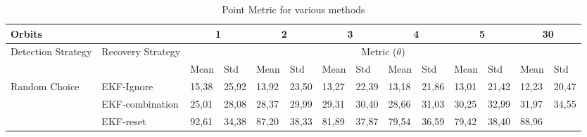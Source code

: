 \begin{table*}[]
	\label{Table: Point Metric for various methods}
	\caption{Point Metric for various methods}
	\centering
	\begin{tabular}{@{}llllllllllllll@{}}
		\toprule
		\multicolumn{2}{l}{Orbits} &
		\multicolumn{2}{c}{1} &
		\multicolumn{2}{c}{2} &
		\multicolumn{2}{c}{3} &
		\multicolumn{2}{c}{4} &
		\multicolumn{2}{c}{5} &
		\multicolumn{2}{c}{30} \\ \midrule
		\multicolumn{1}{|l|}{\multirow{2}{*}{Detection Strategy}} &
		\multicolumn{1}{l|}{\multirow{2}{*}{Recovery Strategy}} &
		\multicolumn{12}{c|}{Metric ($\theta$)} \\ \cmidrule(l){3-14} 
		\multicolumn{1}{|l|}{} &
		\multicolumn{1}{l|}{} &
		\multicolumn{1}{l|}{Mean} &
		\multicolumn{1}{l|}{Std} &
		\multicolumn{1}{l|}{Mean} &
		\multicolumn{1}{l|}{Std} &
		\multicolumn{1}{l|}{Mean} &
		\multicolumn{1}{l|}{Std} &
		\multicolumn{1}{l|}{Mean} &
		\multicolumn{1}{l|}{Std} &
		\multicolumn{1}{l|}{Mean} &
		\multicolumn{1}{l|}{Std} &
		\multicolumn{1}{l|}{Mean} &
		\multicolumn{1}{l|}{Std} \\ \midrule
		\multicolumn{1}{|l|}{\multirow{4}{*}{Random Choice}} &
		\multicolumn{1}{l|}{EKF-Ignore} &
		\multicolumn{1}{l|}{15,38} &
		\multicolumn{1}{l|}{25,92} &
		\multicolumn{1}{l|}{13,92} &
		\multicolumn{1}{l|}{23,50} &
		\multicolumn{1}{l|}{13,27} &
		\multicolumn{1}{l|}{22,39} &
		\multicolumn{1}{l|}{13,18} &
		\multicolumn{1}{l|}{21,86} &
		\multicolumn{1}{l|}{13,01} &
		\multicolumn{1}{l|}{21,42} &
		\multicolumn{1}{l|}{12,23} &
		\multicolumn{1}{l|}{20,47} \\ \cmidrule(l){2-14} 
		\multicolumn{1}{|l|}{} &
		\multicolumn{1}{l|}{EKF-combination} &
		\multicolumn{1}{l|}{25,01} &
		\multicolumn{1}{l|}{28,08} &
		\multicolumn{1}{l|}{28,37} &
		\multicolumn{1}{l|}{29,99} &
		\multicolumn{1}{l|}{29,31} &
		\multicolumn{1}{l|}{30,40} &
		\multicolumn{1}{l|}{28,66} &
		\multicolumn{1}{l|}{31,03} &
		\multicolumn{1}{l|}{30,25} &
		\multicolumn{1}{l|}{32,99} &
		\multicolumn{1}{l|}{31,97} &
		\multicolumn{1}{l|}{34,55} \\ \cmidrule(l){2-14} 
		\multicolumn{1}{|l|}{} &
		\multicolumn{1}{l|}{EKF-reset} &
		\multicolumn{1}{l|}{92,61} &
		\multicolumn{1}{l|}{34,38} &
		\multicolumn{1}{l|}{87,20} &
		\multicolumn{1}{l|}{38,33} &
		\multicolumn{1}{l|}{81,89} &
		\multicolumn{1}{l|}{37,87} &
		\multicolumn{1}{l|}{79,54} &
		\multicolumn{1}{l|}{36,59} &
		\multicolumn{1}{l|}{79,42} &
		\multicolumn{1}{l|}{38,40} &
		\multicolumn{1}{l|}{88,96} &

\end{tabular}
\end{table*}
